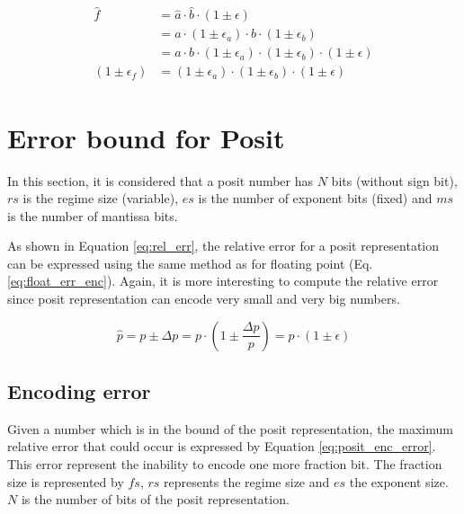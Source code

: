 \begin{align}
\begin{split}
\hat{f} &= \hat{a} \cdot \hat{b} \cdot (1 \pm \epsilon)\\
		&= a \cdot (1 \pm \epsilon_a) \cdot b \cdot (1 \pm \epsilon_b)\\
		&= a \cdot b \cdot (1 \pm \epsilon_a) \cdot (1 \pm \epsilon_b) \cdot (1 \pm \epsilon)\\
(1 \pm \epsilon_f) &= (1 \pm \epsilon_a) \cdot (1 \pm \epsilon_b) \cdot (1 \pm \epsilon)
\end{split}
\label{eq:float_mult_err}
\end{align}

\section{Error bound for Posit}
In this section, it is considered that a posit number has $N$ bits (without sign bit), $rs$ is the regime size (variable), $es$ is the number of exponent bits (fixed) and $ms$ is the number of mantissa bits.

As shown in Equation \ref{eq:rel_err}, the relative error for a posit representation can be expressed using the same method as for floating point (Eq. \ref{eq:float_err_enc}). Again, it is more interesting to compute the relative error since posit representation can encode very small and very big numbers.

\begin{equation}
	\hat{p} = p \pm \Delta p = p \cdot \left(1 \pm \frac{\Delta p}{p}\right) = p \cdot (1 \pm \epsilon)
	\label{eq:rel_err}
\end{equation}

\subsection{Encoding error}
Given a number which is in the bound of the posit representation, the maximum relative error that could occur is expressed by Equation \ref{eq:posit_enc_error}. This error represent the inability to encode one more fraction bit. The fraction size is represented by $fs$, $rs$ represents the regime size and $es$ the exponent size. $N$ is the number of bits of the posit representation.

